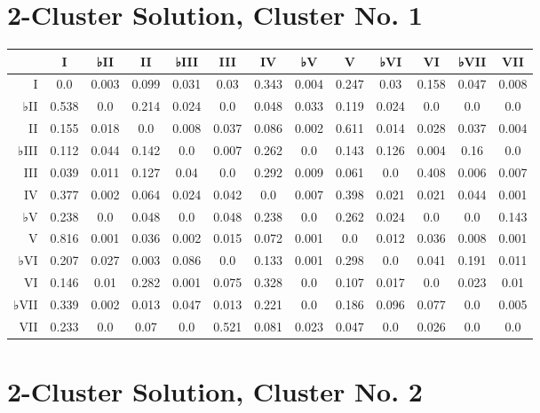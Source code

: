 \section{2-Cluster Solution, Cluster No. 1}
\label{2-clustersolutionclusterno.1}

\begin{table}[htbp]
\begin{minipage}{\linewidth}
\setlength{\tymax}{0.5\linewidth}
\centering
\small
\begin{tabulary}{\textwidth}{@{}RCCCCCCCCCCCC@{}} \toprule
&I&♭II&II&♭III&III&IV&♭V&V&♭VI&VI&♭VII&VII\\
\midrule
I&0.0&0.003&0.099&0.031&0.03&0.343&0.004&0.247&0.03&0.158&0.047&0.008\\
♭II&0.538&0.0&0.214&0.024&0.0&0.048&0.033&0.119&0.024&0.0&0.0&0.0\\
II&0.155&0.018&0.0&0.008&0.037&0.086&0.002&0.611&0.014&0.028&0.037&0.004\\
♭III&0.112&0.044&0.142&0.0&0.007&0.262&0.0&0.143&0.126&0.004&0.16&0.0\\
III&0.039&0.011&0.127&0.04&0.0&0.292&0.009&0.061&0.0&0.408&0.006&0.007\\
IV&0.377&0.002&0.064&0.024&0.042&0.0&0.007&0.398&0.021&0.021&0.044&0.001\\
♭V&0.238&0.0&0.048&0.0&0.048&0.238&0.0&0.262&0.024&0.0&0.0&0.143\\
V&0.816&0.001&0.036&0.002&0.015&0.072&0.001&0.0&0.012&0.036&0.008&0.001\\
♭VI&0.207&0.027&0.003&0.086&0.0&0.133&0.001&0.298&0.0&0.041&0.191&0.011\\
VI&0.146&0.01&0.282&0.001&0.075&0.328&0.0&0.107&0.017&0.0&0.023&0.01\\
♭VII&0.339&0.002&0.013&0.047&0.013&0.221&0.0&0.186&0.096&0.077&0.0&0.005\\
VII&0.233&0.0&0.07&0.0&0.521&0.081&0.023&0.047&0.0&0.026&0.0&0.0\\

\bottomrule

\end{tabulary}
\end{minipage}
\end{table}

\section{2-Cluster Solution, Cluster No. 2}
\label{2-clustersolutionclusterno.2}

